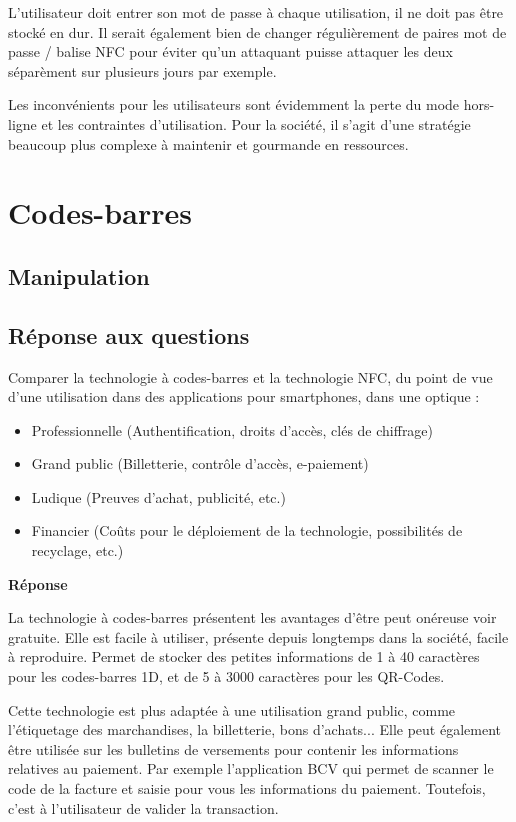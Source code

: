 \documentclass[francais,12pt]{article}
\begin{document}
	 L'utilisateur doit entrer son mot de passe à chaque utilisation, il ne doit pas être stocké en dur. 
	 Il serait également bien de changer régulièrement de paires mot de passe / balise NFC pour éviter qu'un attaquant puisse attaquer les deux séparèment sur plusieurs jours par exemple. 
	 
	 Les inconvénients pour les utilisateurs sont évidemment la perte du mode hors-ligne et les contraintes d'utilisation. Pour la société, il s'agit d'une stratégie beaucoup plus complexe à maintenir et gourmande en ressources.
	 
	\section*{Codes-barres}
	\subsection*{Manipulation}
	\subsection*{Réponse aux questions}
	Comparer la technologie à codes-barres et la technologie NFC, du point de vue d'une utilisation dans des applications pour smartphones, dans une optique : 
	\begin{itemize}
		\item Professionnelle (Authentification, droits d’accès, clés de chiffrage)
		\item Grand public (Billetterie, contrôle d’accès, e-paiement) 
		\item Ludique (Preuves d'achat, publicité, etc.)
		\item Financier (Coûts pour le déploiement de la technologie, possibilités de recyclage, etc.) 
	\end{itemize}

	{\color[rgb]{0,0.5,0.23}\textbf{Réponse}}
	
	La technologie à codes-barres présentent les avantages d'être peut onéreuse voir gratuite. Elle est facile à utiliser, présente depuis longtemps dans la société, facile à reproduire. Permet de stocker des petites informations de 1 à 40 caractères pour les codes-barres 1D, et de 5 à 3000 caractères pour les QR-Codes. 

	Cette technologie est plus adaptée à une utilisation grand public, comme l’étiquetage des marchandises, la billetterie, bons d'achats... 
	Elle peut également être utilisée sur les bulletins de versements pour contenir les informations relatives au paiement. Par exemple l'application BCV qui permet de scanner le code de la facture et saisie pour vous les informations du paiement. Toutefois, c'est à l'utilisateur de valider la transaction.
	
\end{document}
